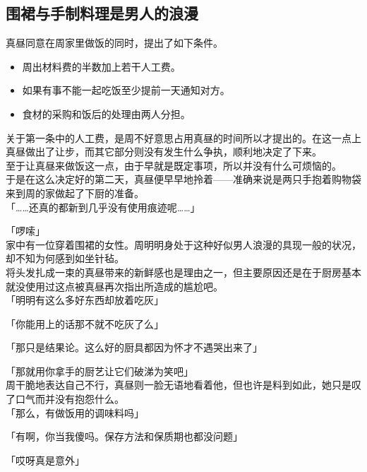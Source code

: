 \subsection{围裙与手制料理是男人的浪漫}

真昼同意在周家里做饭的同时，提出了如下条件。\\

\begin{itemize}
    \item 周出材料费的半数加上若干人工费。
    \item 如果有事不能一起吃饭至少提前一天通知对方。
    \item 食材的采购和饭后的处理由两人分担。
\end{itemize}

关于第一条中的人工费，是周不好意思占用真昼的时间所以才提出的。在这一点上真昼做出了让步，而其它部分则没有发生什么争执，顺利地决定了下来。\\

至于让真昼来做饭这一点，由于早就是既定事项，所以并没有什么可烦恼的。\\

于是在这么决定好的第二天，真昼便早早地拎着——准确来说是两只手抱着购物袋来到周的家做起了下厨的准备。\\

「……还真的都新到几乎没有使用痕迹呢……」

「啰嗦」\\

家中有一位穿着围裙的女性。周明明身处于这种好似男人浪漫的具现一般的状况，却不知为何感到如坐针毡。\\

将头发扎成一束的真昼带来的新鲜感也是理由之一，但主要原因还是在于厨房基本就没使用过这点被真昼再次指出所造成的尴尬吧。\\

「明明有这么多好东西却放着吃灰」

「你能用上的话那不就不吃灰了么」

「那只是结果论。这么好的厨具都因为怀才不遇哭出来了」

「那就用你拿手的厨艺让它们破涕为笑吧」\\

周干脆地表达自己不行，真昼则一脸无语地看着他，但也许是料到如此，她只是叹了口气而并没有抱怨什么。\\

「那么，有做饭用的调味料吗」

「有啊，你当我傻吗。保存方法和保质期也都没问题」

「哎呀真是意外」

